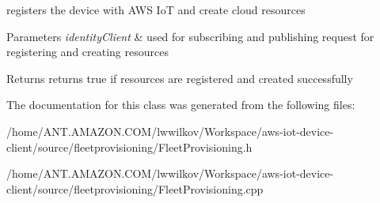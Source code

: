 registers the device with A\+WS IoT and create cloud resources 


\begin{DoxyParams}{Parameters}
{\em identity\+Client} & used for subscribing and publishing request for registering and creating resources \\
\hline
\end{DoxyParams}
\begin{DoxyReturn}{Returns}
returns true if resources are registered and created successfully 
\end{DoxyReturn}


The documentation for this class was generated from the following files\+:\begin{DoxyCompactItemize}
\item 
/home/\+A\+N\+T.\+A\+M\+A\+Z\+O\+N.\+C\+O\+M/lwwilkov/\+Workspace/aws-\/iot-\/device-\/client/source/fleetprovisioning/Fleet\+Provisioning.\+h\item 
/home/\+A\+N\+T.\+A\+M\+A\+Z\+O\+N.\+C\+O\+M/lwwilkov/\+Workspace/aws-\/iot-\/device-\/client/source/fleetprovisioning/Fleet\+Provisioning.\+cpp\end{DoxyCompactItemize}
